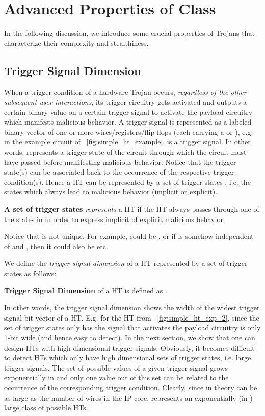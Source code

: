 \documentclass[10pt,journal,compsoc]{IEEEtran}
\begin{document}
\section{Advanced Properties of Class } \label{sec:HD}

In the following discussion, we introduce some crucial properties of  Trojans that characterize their complexity and stealthiness.

\subsection{Trigger Signal Dimension }
When a trigger condition of a hardware Trojan occurs, {\em regardless of the other subsequent user interactions}, its trigger circuitry gets activated and outputs a certain binary value on a certain trigger signal  to activate the payload circuitry which manifests malicious behavior.
A trigger signal  is represented as a labeled binary vector of one or more wires/registers/flip-flops (each carrying a  or ), e.g. in the example circuit of \figurename~\ref{fig:simple_ht_example},  is a trigger signal.
In other words,  represents a trigger state of the circuit through which the circuit must have passed before manifesting malicious behavior.
Notice that the trigger state(s) can be associated back to the occurrence of the respective trigger condition(s).
Hence a HT can be represented by a set of trigger states ; i.e. the states which always lead to malicious behavior (implicit or explicit).
\begin{definition} 
\textbf{A set \boldmath{} of trigger states} \textit{represents} a HT if the HT always passes through one of the states in  in order to express implicit of explicit malicious behavior.
\end{definition}

\vspace{3pt}
Notice that {} is not unique. 
For example, {} could be {}, or if  is somehow independent of  and , then it could also be {} etc.

We define the \textit{trigger signal dimension}  of a HT represented by a set of trigger states  as follows:
\begin{definition} 
\textbf{Trigger Signal Dimension \boldmath{}} of a HT is defined as .
\end{definition}

\vspace{3pt}
In other words, the trigger signal dimension shows the width of the widest trigger signal bit-vector of a HT.
E.g. for the HT from \figurename~\ref{fig:simple_ht_exp_2},  since the set of trigger states {} only has the signal  that activates the payload circuitry is only 1-bit wide (and hence easy to detect).
In the next section, we show that one can design HTs with high dimensional trigger signals.
Obviously, it becomes difficult to detect HTs which only have high dimensional sets of trigger states, i.e. large trigger signals.
The set of possible values of a given trigger signal  grows exponentially in  and only one value out of this set can be related to the occurrence of the corresponding trigger condition. 
Clearly, since in theory  can be as large as the number of wires  in the IP core,  represents an exponentially (in ) large class of possible HTs.
\end{document}
